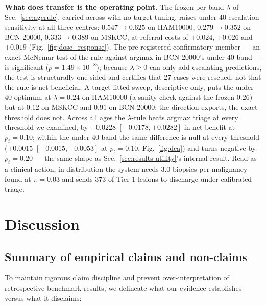 \documentclass[journal]{IEEEtran}
\begin{document}
\textbf{What does transfer is the operating point.} The frozen per-band $\lambda$ of
Sec.~\ref{sec:agerule}, carried
across with no target tuning, raises under-$40$ escalation sensitivity at all three centres:
$0.547\rightarrow0.625$ on HAM10000, $0.279\rightarrow0.352$ on BCN-20000,
$0.333\rightarrow0.389$ on MSKCC, at referral costs of $+0.024$, $+0.026$ and $+0.019$
(Fig.~\ref{fig:dose_response}). The
pre-registered confirmatory member --- an exact McNemar test of the rule against argmax in
BCN-20000's under-$40$ band --- is significant ($p=1.49\times10^{-8}$); because $\lambda\ge0$
can only add escalating predictions, the test is structurally one-sided and certifies that
$27$ cases were rescued, not that the rule is net-beneficial. A target-fitted sweep, descriptive
only, puts the under-$40$ optimum at $\lambda=0.24$ on HAM10000 (a sanity check against the
frozen $0.26$) but at $0.12$ on MSKCC and $0.91$ on BCN-20000: the direction exports, the exact
threshold does not. Across all ages the $\lambda$-rule beats argmax triage at every threshold
we examined, by $+0.0228$ $[+0.0178,+0.0282]$ in net benefit at $p_t=0.10$; within the
under-$40$ band the same difference is null at every threshold ($+0.0015$ $[-0.0015,+0.0053]$
at $p_t=0.10$, Fig.~\ref{fig:dca}) and turns negative by $p_t=0.20$ --- the same shape as
Sec.~\ref{sec:results-utility}'s internal result. Read as a clinical action, in distribution the
system needs $3.0$ biopsies per malignancy found at $\pi=0.03$ and sends $373$ of Tier-1
lesions to discharge under calibrated triage.

\section{Discussion}

\subsection{Summary of empirical claims and non-claims}
To maintain rigorous claim discipline and prevent over-interpretation of retrospective benchmark results, we delineate what our evidence establishes versus what it disclaims:
\end{document}
